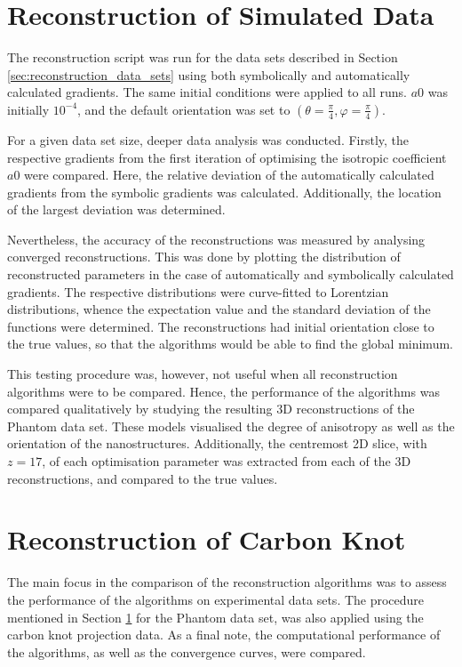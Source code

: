 

\section{Reconstruction of Simulated Data}\label{sec:pp_nanostructures_reconstruction}


The reconstruction script was run for the data sets described in Section \ref{sec:reconstruction_data_sets} using both symbolically and automatically calculated gradients.
The same initial conditions were applied to all runs.
$a0$ was initially $10^{-4}$, and the default orientation was set to $\left( \theta = \frac{\pi}{4}, \varphi = \frac{\pi}{4} \right)$.

For a given data set size, deeper data analysis was conducted.
Firstly, the respective gradients from the first iteration of optimising the isotropic coefficient $a0$ were compared.
Here, the relative deviation of the automatically calculated gradients from the symbolic gradients was calculated.
Additionally, the location of the largest deviation was determined.

Nevertheless, the accuracy of the reconstructions was measured by analysing converged reconstructions.
This was done by plotting the distribution of reconstructed parameters in the case of automatically and symbolically calculated gradients.
The respective distributions were curve-fitted to Lorentzian distributions, whence the expectation value and the standard deviation of the functions were determined.
The reconstructions had initial orientation close to the true values, so that the algorithms would be able to find the global minimum.

This testing procedure was, however, not useful when all reconstruction algorithms were to be compared.
Hence, the performance of the algorithms was compared qualitatively by studying the resulting 3D reconstructions of the Phantom data set.
These models visualised the degree of anisotropy as well as the orientation of the nanostructures.
Additionally, the centremost 2D slice, with $z = 17$, of each optimisation parameter was extracted from each of the 3D reconstructions, and compared to the true values.

\section{Reconstruction of Carbon Knot}


The main focus in the comparison of the reconstruction algorithms was to assess the performance of the algorithms on experimental data sets.
The procedure mentioned in Section \ref{sec:pp_nanostructures_reconstruction} for the Phantom data set, was also applied using the carbon knot projection data.
As a final note, the computational performance of the algorithms, as well as the convergence curves, were compared.